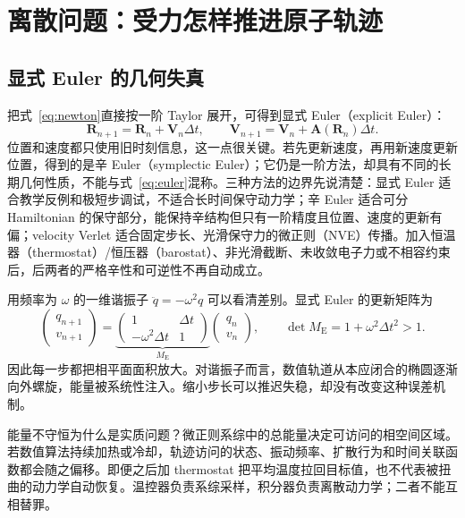 \documentclass[UTF8,10pt,a4paper,fontset=none]{ctexart}
\begin{document}
\section{离散问题：受力怎样推进原子轨迹}

\subsection{显式 Euler 的几何失真}

把式~\eqref{eq:newton}直接按一阶 Taylor 展开，可得到显式 Euler（explicit Euler）：
\begin{equation}
  \bm R_{n+1}=\bm R_n+\bm V_n\Delta t,
  \qquad
  \bm V_{n+1}=\bm V_n+\bm A(\bm R_n)\Delta t.
  \label{eq:euler}
\end{equation}
位置和速度都只使用旧时刻信息，这一点很关键。若先更新速度，再用新速度更新位置，得到的是辛 Euler（symplectic Euler）；它仍是一阶方法，却具有不同的长期几何性质，不能与式~\eqref{eq:euler}混称。三种方法的边界先说清楚：显式 Euler 适合教学反例和极短步调试，不适合长时间保守动力学；辛 Euler 适合可分 Hamiltonian 的保守部分，能保持辛结构但只有一阶精度且位置、速度的更新有偏；velocity Verlet 适合固定步长、光滑保守力的微正则（NVE）传播。加入恒温器（thermostat）/恒压器（barostat）、非光滑截断、未收敛电子力或不相容约束后，后两者的严格辛性和可逆性不再自动成立。

用频率为 $\omega$ 的一维谐振子 $\ddot q=-\omega^2q$ 可以看清差别。显式 Euler 的更新矩阵为
\begin{equation}
  \begin{pmatrix}q_{n+1}\\v_{n+1}\end{pmatrix}
  =
  \underbrace{\begin{pmatrix}
  1 & \Delta t\\-\omega^2\Delta t & 1
  \end{pmatrix}}_{M_{\mathrm E}}
  \begin{pmatrix}q_n\\v_n\end{pmatrix},
  \qquad
  \det M_{\mathrm E}=1+\omega^2\Delta t^2>1.
\end{equation}
因此每一步都把相平面面积放大。对谐振子而言，数值轨道从本应闭合的椭圆逐渐向外螺旋，能量被系统性注入。缩小步长可以推迟失稳，却没有改变这种误差机制。

能量不守恒为什么是实质问题？微正则系综中的总能量决定可访问的相空间区域。若数值算法持续加热或冷却，轨迹访问的状态、振动频率、扩散行为和时间关联函数都会随之偏移。即便之后加 thermostat 把平均温度拉回目标值，也不代表被扭曲的动力学自动恢复。温控器负责系综采样，积分器负责离散动力学；二者不能互相替罪。
\end{document}
